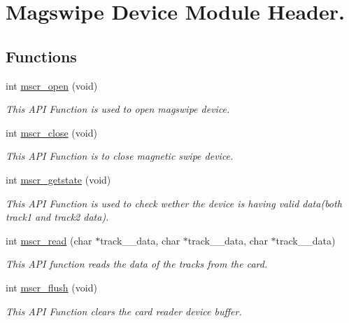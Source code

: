 \hypertarget{group__D}{\section{Magswipe Device Module Header.}
\label{group__D}
}
\subsection*{Functions}
\begin{DoxyCompactItemize}
\item 
int \hyperlink{group__D_gafa3a94e588b1ba39a77cee64b1e68c49}{mscr\+\_\+open} (void)
\begin{DoxyCompactList}\small\item\em This A\+P\+I Function is used to open magswipe device. \end{DoxyCompactList}\item 
int \hyperlink{group__D_gaf9a8351a0558d4148917a02f3ca56daf}{mscr\+\_\+close} (void)
\begin{DoxyCompactList}\small\item\em This A\+P\+I Function is to close magnetic swipe device. \end{DoxyCompactList}\item 
int \hyperlink{group__D_ga5a3cd52dc4c6e21ac0a8a3aad4e53fdb}{mscr\+\_\+getstate} (void)
\begin{DoxyCompactList}\small\item\em This A\+P\+I Function is used to check wether the device is having valid data(both track1 and track2 data). \end{DoxyCompactList}\item 
int \hyperlink{group__D_gaf5add969f80c642176e8f048c1685d5a}{mscr\+\_\+read} (char $\ast$track\+\_\+\_\+data, char $\ast$track\+\_\+\_\+data, char $\ast$track\+\_\+\_\+data)
\begin{DoxyCompactList}\small\item\em This A\+P\+I function reads the data of the tracks from the card. \end{DoxyCompactList}\item 
int \hyperlink{group__D_ga70cf19854d6bbce3b16d0038dbe69ff4}{mscr\+\_\+flush} (void)
\begin{DoxyCompactList}\small\item\em This A\+P\+I Function clears the card reader device buffer. \end{DoxyCompactList}\end{DoxyCompactItemize}


